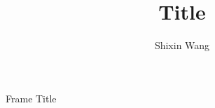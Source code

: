 \documentclass[serif, professionalfont]{beamer}
\title{Title}
\author{Shixin Wang}
\begin{document}
\maketitle

\begin{frame}{Frame Title}
    
\end{frame}
\end{document}
